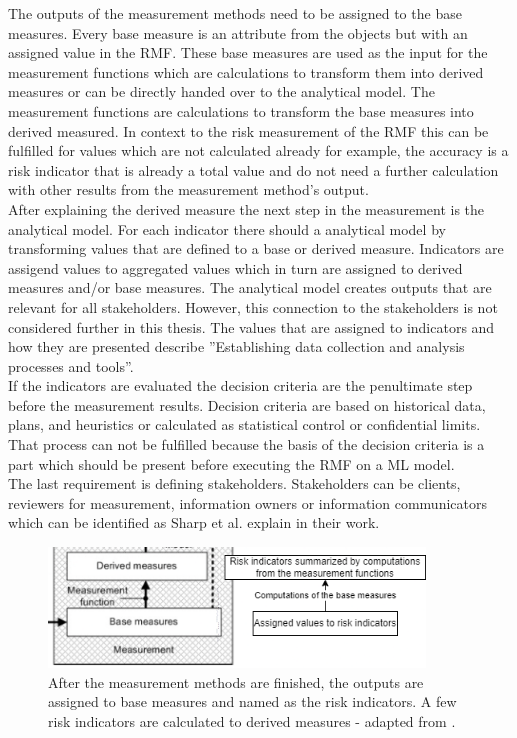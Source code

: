 The outputs of the measurement methods need to be assigned to the base measures. Every base measure is an attribute from the objects but with
an assigned value in the RMF. These base measures are used as the input for the measurement functions which are calculations to transform them into derived measures or can be directly handed over to the analytical model. The measurement functions are calculations to transform the base measures into derived measured. In context to the risk measurement of the RMF this can be fulfilled for values which are not calculated already for example, the accuracy is a risk indicator that is already a total value \cite{9783960101925} and do not need a further calculation with other results from the measurement method's output. \\
After explaining the derived measure the next step in the measurement is the analytical model. For each indicator there should a analytical model by transforming values that are defined to a base or derived measure. Indicators are assigend values to aggregated values which in turn are assigned to derived measures and/or base measures. The analytical model creates outputs that are relevant for all stakeholders. However, this connection to the stakeholders is not considered further in this thesis. The values that are assigned to indicators and how they are presented describe ''Establishing data collection and analysis processes and tools''. \\
If the indicators are evaluated the decision criteria are the penultimate step before the measurement results. Decision criteria are based on historical data, plans, and heuristics or calculated as statistical control or confidential limits. That process can not be fulfilled because the basis of the decision criteria is a part which should be present before executing the RMF on a ML model. \\
The last requirement is defining stakeholders. Stakeholders can be clients, reviewers for measurement, information owners or information communicators \cite{ISO_27004_2009} which can be identified as Sharp et al. \cite{DBLP:conf/dexaw/SharpFG99} explain in their work.

\begin{figure}[ht!]
  \centering
  \includegraphics[width=10cm]{pictures/base_to_derived_measure.png}
  \caption{After the measurement methods are finished, the outputs are assigned to base measures and named as the risk indicators. A few risk indicators are calculated to derived measures - adapted from \cite{ISO_27004_2009}.}
  \label{fig:base_to_derived_measure}
\end{figure}

